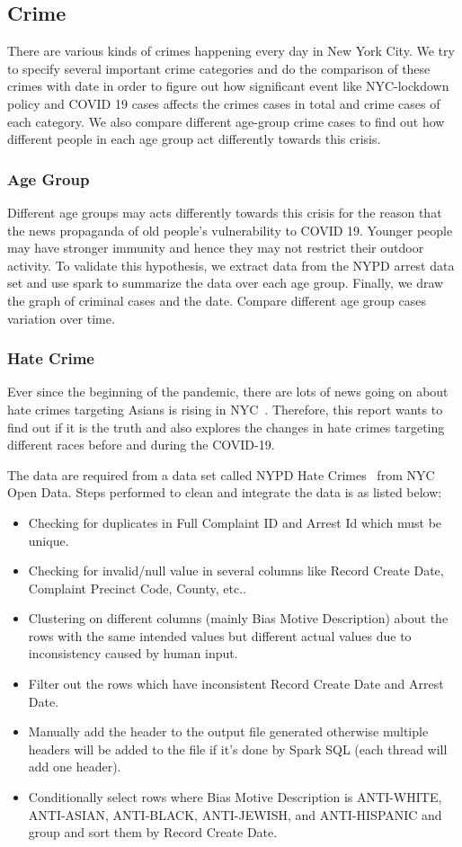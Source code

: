 \documentclass[conference]{IEEEtran}
\begin{document}
\subsection{Crime}
There are various kinds of crimes happening every day in New York City. We try to specify several important crime categories and do the comparison of these crimes with date in order to figure out how significant event like NYC-lockdown policy and COVID 19 cases affects the crimes cases in total and crime cases of each category. We also compare different age-group crime cases to find out how different people in each age group act differently towards this crisis.

\subsubsection{Age Group}
Different age groups may acts differently towards this crisis for the reason that the news propaganda of old people's vulnerability to COVID 19. Younger people may have stronger immunity and hence they may not restrict their outdoor activity. To validate this hypothesis, we extract data from the NYPD arrest data set and use spark to summarize the data over each age group. Finally, we draw the graph of criminal cases and the date. Compare different age group cases variation over time.


\subsubsection{Hate Crime}
Ever since the beginning of the pandemic, there are lots of news going on about hate crimes targeting Asians is rising in NYC~\cite{irene2020hatecrimes}. Therefore, this report wants to find out if it is the truth and also explores the changes in hate crimes targeting different races before and during the COVID-19.

The data are required from a data set called NYPD Hate Crimes~\cite{NYPD2020hatecrimes} from NYC Open Data. Steps performed to clean and integrate the data is as listed below:
\begin{itemize}
    \item Checking for duplicates in Full Complaint ID and Arrest Id which must be unique.
    \item Checking for invalid/null value in several columns like Record Create Date,	Complaint Precinct Code, County, etc..
    \item Clustering on different columns (mainly Bias Motive Description) about the rows with the same intended values but different actual values due to inconsistency caused by human input.
    \item Filter out the rows which have inconsistent Record Create Date and Arrest Date.
    \item Manually add the header to the output file generated otherwise multiple headers will be added to the file if it's done by Spark SQL (each thread will add one header). 
    \item Conditionally select rows where Bias Motive Description is ANTI-WHITE, ANTI-ASIAN, ANTI-BLACK, ANTI-JEWISH, and ANTI-HISPANIC and group and sort them by Record Create Date.
\end{itemize}
\end{document}
